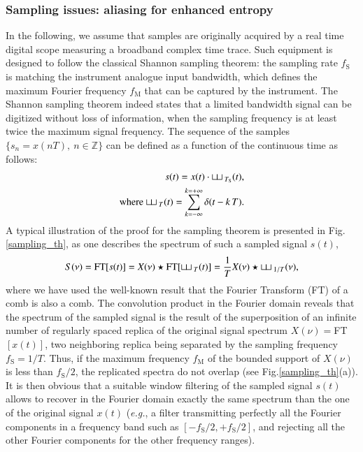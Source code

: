 \subsubsection{Sampling issues: aliasing for enhanced entropy}
\label{sampling issues}
%
In the following, we assume that samples are originally acquired by a real time digital scope measuring a broadband complex time trace. Such equipment is designed to follow the classical Shannon sampling theorem: the sampling rate $f_\text{S}$ is matching the instrument analogue input bandwidth, which defines the maximum Fourier frequency $f_\text{M}$ that can be captured by the instrument. The Shannon sampling theorem indeed states that a limited bandwidth signal can be digitized without loss of information, when the sampling frequency is at least twice the maximum signal frequency. The sequence of the samples $\{s_n=x(nT),~n\in\mathbb{Z}\}$ can be defined as a function of the continuous time as follows:
\begin{eqnarray}
  \label{eq:sampling1}
  s(t)=x(t)\cdot{\sqcup\!\sqcup}\,_{T_\text{S}}(t), \\
  \nonumber \text{where}~{\sqcup\!\sqcup}\,_T(t)=\sum_{k=-\infty}^{k=+\infty}\delta(t-k\,T) .
\end{eqnarray}
A typical illustration of the proof for the sampling theorem is presented in Fig.\ref{sampling_th}, as one describes the spectrum of such a sampled signal $s(t)$,
%
\begin{equation}
  \label{eq:S(nu)}
  S(\nu)=\text{FT}[s(t)]=X(\nu)\star \text{FT}[{\sqcup\!\sqcup}\,_T(t)]
  =\frac{1}{T}X(\nu)\star {\sqcup\!\sqcup}\,_{1/T}(\nu),
\end{equation}
%
where we have used the well-known result that the Fourier Transform (FT) of a comb is also a comb. The convolution product in the Fourier domain reveals that the spectrum of the sampled signal is the result of the superposition of an infinite number of regularly spaced replica of the original signal spectrum $X(\nu)=$FT$[x(t)]$, two neighboring replica being separated by the sampling frequency $f_\text{S}=1/T$. Thus, if the maximum frequency $f_\text{M}$ of the bounded support of $X(\nu)$ is less than $f_\text{S}/2$, the replicated spectra do not overlap (see Fig.\ref{sampling_th}(a)). It is then obvious that a suitable window filtering of the sampled signal $s(t)$ allows to recover in the Fourier domain exactly the same spectrum than the one of the original signal $x(t)$ (\emph{e.g.}, a filter transmitting perfectly all the Fourier components in a frequency band such as $[-f_\text{S}/2,+f_\text{S}/2]$, and rejecting all the other Fourier components for the other frequency ranges).
